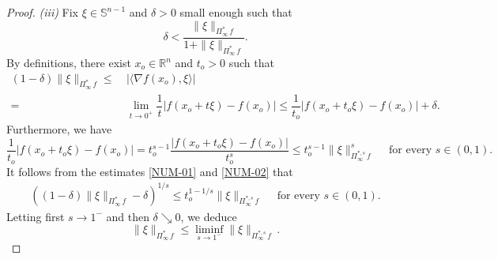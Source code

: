 \documentclass[11pt, reqno]{article}
\theoremstyle{definition}
\numberwithin{equation}{section}
\newcommand{\R}{\mathbb{R}}
\newcommand{\Sphere}{\mathbb{S}^{n - 1}}
\begin{document}
\begin{proof}
\medskip

\textit{(iii)} 
Fix $\xi \in \Sphere$ and $\delta > 0$ small enough such that
\[
    \delta < \dfrac{\| \xi \|_{\Pi^\ast_\infty \, f} }{1 +  \| \xi \|_{\Pi^\ast_\infty\, f} }.
\]
By definitions, there exist $x_o \in \R^n$ and $t_o > 0$
such that 
    \begin{equation}\label{NUM-01}
    \begin{split}
        (1 - \delta) \| \xi \|_{\Pi^\ast_\infty \, f} 
        \leq & ~
        | \langle \nabla f(x_o), \xi \rangle | \\
        = & ~ \lim_{t \to 0^+} \dfrac{1}{t} |f(x_o + t\xi) - f(x_o)| \leq \dfrac{1}{t_o} |f(x_o + t_o \xi) - f(x_o)| + \delta.
    \end{split}
    \end{equation}
Furthermore, we have
    \begin{equation}\label{NUM-02}
        \dfrac{1}{t_o} |f(x_o + t_o \xi) - f(x_o)| 
        = 
        t_o^{s - 1} \dfrac{|f(x_o + t_o \xi) - f(x_o)|}{t_o^s}
        \leq t_o^{s - 1} \| \xi \|^s_{\Pi^{\ast, s}_\infty \, f} \quad \text{ for every } s \in (0, 1).
    \end{equation}
It follows from the estimates \eqref{NUM-01} and  \eqref{NUM-02} that
    \begin{align*}
        \left( 
        (1 - \delta) \| \xi \|_{\Pi^\ast_\infty \, f} - \delta
        \right)^{1/s} \leq t_o^{1 - 1/s} \| \xi \|_{\Pi^{\ast, s}_\infty \, f} \quad \text{ for every } s \in (0, 1).
    \end{align*}
Letting first $s \to 1^-$ and then $\delta \searrow 0$, we deduce
    \begin{equation}\label{liminf-sup-t^s}
        \| \xi \|_{\Pi^\ast_\infty \, f} \leq \liminf_{s \to 1^-}  \| \xi \|_{\Pi^{\ast, s}_\infty \, f} \, .
    \end{equation}
    
\medskip


\end{proof}
\end{document}
